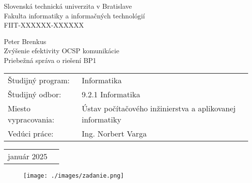 \documentclass[12pt, twoside]{book}
\def\mfrok{január 2025}
\def\mfnazov{Zvýšenie efektivity OCSP komunikácie}
\def\mftyp{Priebežná správa o riešení BP1}
\def\mfautor{Peter Brenkus}
\def\mfveduci{Ing. Norbert Varga}
\def\mfodbor{9.2.1 Informatika}%
\def\program{ Informatika }
\def\mfpracovisko{  Ústav počítačového inžinierstva a aplikovanej informatiky }
\begin{document}
 
   
\frontmatter





\thispagestyle{empty}
\noindent

\begin{center}
\sc  
\large

Slovenská technická univerzita v Bratislave\\
Fakulta informatiky a informačných technológií\\
\bigskip
FIIT-XXXXXX-XXXXXX %

\vfill

\mfautor\\
\bigskip
{\mfnazov}\\
\bigskip
\mftyp
\end{center}

\vfill

\noindent
\begin{tabular}{@{}ll}
Študijný program: & \program \\
Študijný odbor: & \mfodbor \\
Miesto vypracovania: & \mfpracovisko \\
Vedúci práce: & \mfveduci \\
\end{tabular}

\bigskip



\noindent
\begin{tabular}{@{}ll}
\mfrok\\
\end{tabular}

\eject %



\newpage\null\thispagestyle{empty}\newpage

\begin{figure}
\texttt{[image: ./images/zadanie.png]}
\end{figure}


\newpage\null\thispagestyle{empty}\newpage


\frontmatter

\newpage
\thispagestyle{empty} 
~
\end{document}
